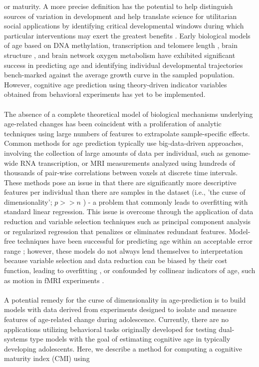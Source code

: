 \documentclass[utf8]{frontiersSCNS} %
\begin{document}
or maturity. A more precise definition has the potential to help distinguish sources of variation in development and help translate science for utilitarian social applications by identifying critical developmental windows during which particular interventions may exert the greatest benefits \citep{somerville2016searching}. Early biological models of age based on DNA methylation, transcription and telomere length \citep{baker1988biomarkers, jylhava2017biological}, brain structure \citep{khundrakpam2015prediction,aycheh2018biological,madan2018predicting}, and brain network oxygen metabolism \citep{dosenbach2010prediction, qin2015predicting} have exhibited significant success in predicting age and identifying individual developmental trajectories bench-marked against the average growth curve in the sampled population. However, cognitive age prediction using theory-driven indicator variables obtained from behavioral experiments has yet to be implemented. \paragraph*{} The absence of a complete theoretical model of biological mechanisms underlying age-related changes has been coincident with a proliferation of analytic techniques using large numbers of features to extrapolate sample-specific effects. Common methods for age prediction typically use big-data-driven approaches, involving the collection of large amounts of data per individual, such as genome-wide RNA transcription, or MRI measurements analyzed using hundreds of thousands of pair-wise correlations between voxels at discrete time intervals. These methods pose an issue in that there are significantly more descriptive features per individual than there are samples in the dataset (i.e., 'the curse of dimensionality'; $p >> n$ \cite{taylor2019}) - a problem that commonly leads to overfitting with standard linear regression. This issue is overcome through the application of data reduction and variable selection techniques such as principal component analysis or regularized regression that penalizes or eliminates redundant features. Model-free techniques have been successful for predicting age within an acceptable error range \citep{cole2017predicting}; however, these models do not always lend themselves to interpretation because variable selection and data reduction can be biased by their cost function, leading to overfitting \citep{babyak2004you}, or confounded by collinear indicators of age, such as motion in fMRI experiments \citep{satterthwaite2013heterogeneous}. \paragraph*{} A potential remedy for the curse of dimensionality in age-prediction is to build models with data derived from experiments designed to isolate and measure features of age-related change during adolescence. Currently, there are no applications utilizing behavioral tasks originally developed for testing dual-systems type models with the goal of estimating cognitive age in typically developing adolescents. Here, we describe a method for computing a cognitive maturity index (CMI) using 
\end{document}
